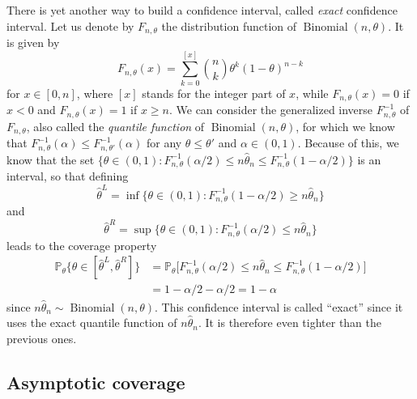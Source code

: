 \documentclass[
	fontsize=11pt, %
	twoside=false, %
	numbers=noenddot, %
]{kaobook}
\DeclareMathOperator{\bin}{Binomial}
\renewcommand{\P}{\mathbb P}
\newcommand{\wh}{\widehat}
\begin{document}
There is yet another way to build a confidence interval, called \emph{exact} confidence interval.
Let us denote by $F_{n, \theta}$ the distribution function of $\bin(n, \theta)$. 
It is given by
\begin{equation}
	\label{eq:binomial_distribution}
	F_{n, \theta}(x) = \sum_{k=0}^{[x]}\binom{n}{k} \theta^k (1 - \theta)^{n - k}
\end{equation}
for $x \in [0, n]$, where $[x]$ stands for the integer part of $x$, while $F_{n, \theta}(x) = 0$ if $x < 0$ and $F_{n, \theta}(x) = 1$ if $x \geq n$.
We can consider the generalized inverse $F_{n, \theta}^{-1}$ of $F_{n, \theta}$,  also called the \emph{quantile function} of $\bin(n, \theta)$, for which we know that $F_{n, \theta}^{-1}(\alpha) \leq F_{n, \theta'}^{-1}(\alpha)$ for any $\theta \leq \theta'$ and $\alpha \in (0, 1)$.%
Because of this, we know that the set $\{ \theta \in (0, 1) : F_{n, \theta}^{-1}(\alpha / 2) \leq n \wh \theta_n \leq F_{n, \theta}^{-1}(1 - \alpha / 2) \}$ is an interval, so that defining
\begin{equation*}
	\wh \theta^L = \inf\{ \theta \in (0, 1) : F_{n, \theta}^{-1}(1 - \alpha / 2) \geq n \wh \theta_n  \}
\end{equation*}
and
\begin{equation*}
	\wh \theta^R = \sup\{ \theta \in (0, 1) : F_{n, \theta}^{-1}(\alpha / 2) \leq n \wh \theta_n  \}
\end{equation*}
leads to the coverage property
\begin{align*}
	\P_\theta \big\{ \theta \in [\wh \theta^L, \wh \theta^R] \big\} 
	&= \P_\theta\big[ F_{n, \theta}^{-1}(\alpha / 2) \leq n \wh \theta_n \leq F_{n, \theta}^{-1}(1 - \alpha / 2) \big] \\
	&= 1 - \alpha / 2 - \alpha / 2 = 1 - \alpha
\end{align*}
since $n \wh \theta_n \sim \bin(n, \theta)$.
This confidence interval is called ``exact'' since it uses the exact quantile function of $n \wh \theta_n$. It is therefore even tighter than the previous ones.


\subsection{Asymptotic coverage} %
\label{sub:asymptotic_coverage}
\end{document}
